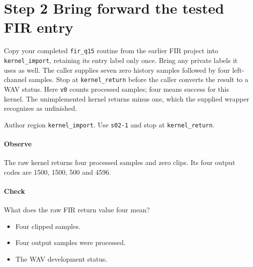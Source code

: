\section{Step 2 Bring forward the tested FIR entry}\label{pcm-wav-s02}
Copy your completed \texttt{fir\_q15} routine from the earlier FIR project into \texttt{kernel\_import}, retaining its entry label only once. Bring any private labels it uses as well. The caller supplies seven zero history samples followed by four left-channel samples. Stop at \texttt{kernel\_return} before the caller converts the result to a WAV status. Here \texttt{v0} counts processed samples; four means success for this kernel. The unimplemented kernel returns minus one, which the supplied wrapper recognizes as unfinished.

Author region \texttt{kernel\_import}. Use \texttt{s02-1} and stop at \texttt{kernel\_return}.

\paragraph{Observe} The raw kernel returns four processed samples and zero clips. Its four output codes are 1500, 1500, 500 and 4596.

\paragraph{Check} What does the raw FIR return value four mean?
\begin{itemize}
  \item[A.] Four clipped samples.
  \item[B.] Four output samples were processed.
  \item[C.] The WAV development status.
\end{itemize}
